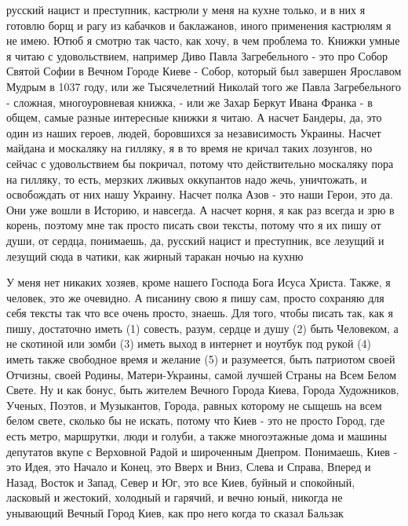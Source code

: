 
русский нацист и преступник, кастрюли у меня на кухне только, и в них я готовлю
борщ и рагу из кабачков и баклажанов, иного применения кастрюлям я не имею.
Ютюб я смотрю так часто, как хочу, в чем проблема то. Книжки умные я читаю с
удовольствием, например Диво Павла Загребельного - это про Собор Святой Софии в
Вечном Городе Киеве - Собор, который был завершен Ярославом Мудрым в 1037 году,
или же Тысячелетний Николай того же Павла Загребельного - сложная,
многоуровневая книжка, - или же Захар Беркут Ивана Франка - в общем, самые
разные интересные книжки я читаю. А насчет Бандеры, да, это один из наших
героев, людей, боровшихся за независимость Украины. Насчет майдана и москаляку
на гилляку, я в то время не кричал таких лозунгов, но сейчас с удовольствием бы
покричал, потому что действительно москаляку пора на гилляку, то есть, мерзких
лживых оккупантов надо жечь, уничтожать, и освобождать от них нашу Украину.
Насчет полка Азов - это наши Герои, это да. Они уже вошли в Историю, и
навсегда. А насчет корня, я как раз всегда и зрю в корень, поэтому мне так
просто писать свои тексты, потому что я их пишу от души, от сердца, понимаешь,
да, русский нацист и преступник, все лезущий и лезущий сюда в чатики, как
жирный таракан ночью на кухню


У меня нет никаких хозяев, кроме нашего Господа Бога Исуса Христа.  Также, я
человек, это же очевидно. А писанину свою я пишу сам, просто сохраняю для себя
тексты так что все очень просто, знаешь. Для того, чтобы писать так, как я
пишу, достаточно иметь (1) совесть, разум, сердце и душу (2) быть Человеком, а
не скотиной или зомби (3) иметь выход в интернет и ноутбук под рукой (4) иметь
также свободное время и желание (5) и разумеется, быть патриотом своей Отчизны,
своей Родины, Матери-Украины, самой лучшей Страны на Всем Белом Свете. Ну и как
бонус, быть жителем Вечного Города Киева, Города Художников, Ученых, Поэтов, и
Музыкантов, Города, равных которому не сыщешь на всем белом свете, сколько бы
не искать, потому что Киев - это не просто Город, где есть метро, маршрутки,
люди и голуби, а также многоэтажные дома и машины депутатов вкупе с Верховной
Радой и широченным Днепром. Понимаешь, Киев - это Идея, это Начало и Конец, это
Вверх и Вниз, Слева и Справа, Вперед и Назад, Восток и Запад, Север и Юг, это
все Киев, буйный и спокойный, ласковый и жестокий, холодный и гарячий, и вечно
юный, никогда не унывающий Вечный Город Киев, как про него когда то сказал
Бальзак

